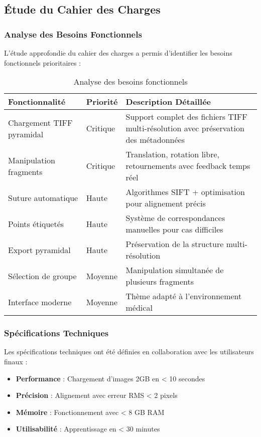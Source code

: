 \documentclass[12pt,a4paper]{article}
\begin{document}
\subsection{Étude du Cahier des Charges}

\subsubsection{Analyse des Besoins Fonctionnels}

L'étude approfondie du cahier des charges a permis d'identifier les besoins fonctionnels prioritaires :

\begin{table}[h]
\centering
\begin{tabular}{|p{4cm}|p{2cm}|p{6cm}|}
\hline
\textbf{Fonctionnalité} & \textbf{Priorité} & \textbf{Description Détaillée} \\
\hline
Chargement TIFF pyramidal & Critique & Support complet des fichiers TIFF multi-résolution avec préservation des métadonnées \\
\hline
Manipulation fragments & Critique & Translation, rotation libre, retournements avec feedback temps réel \\
\hline
Suture automatique & Haute & Algorithmes SIFT + optimisation pour alignement précis \\
\hline
Points étiquetés & Haute & Système de correspondances manuelles pour cas difficiles \\
\hline
Export pyramidal & Haute & Préservation de la structure multi-résolution \\
\hline
Sélection de groupe & Moyenne & Manipulation simultanée de plusieurs fragments \\
\hline
Interface moderne & Moyenne & Thème adapté à l'environnement médical \\
\hline
\end{tabular}
\caption{Analyse des besoins fonctionnels}
\end{table}

\subsubsection{Spécifications Techniques}

Les spécifications techniques ont été définies en collaboration avec les utilisateurs finaux :

\begin{itemize}
\item \textbf{Performance} : Chargement d'images 2GB en < 10 secondes
\item \textbf{Précision} : Alignement avec erreur RMS < 2 pixels
\item \textbf{Mémoire} : Fonctionnement avec < 8 GB RAM
\item \textbf{Utilisabilité} : Apprentissage en < 30 minutes
\end{itemize}
\end{document}

